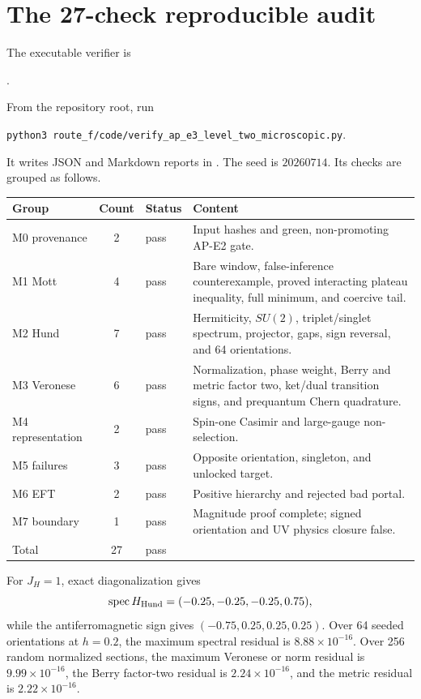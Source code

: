 \documentclass[11pt]{article}
\theoremstyle{definition}
\theoremstyle{remark}
\begin{document}
\section{The 27-check reproducible audit}

The executable verifier is
\begin{center}
.
\end{center}
From the repository root, run
\begin{center}
\texttt{python3 route\_f/code/verify\_ap\_e3\_level\_two\_microscopic.py}.
\end{center}
It writes JSON and Markdown reports in .  The seed is
\(20260714\).  Its checks are grouped as follows.

\begin{center}
\begin{tabularx}{\textwidth}{@{}lclX@{}}
\toprule
Group & Count & Status & Content\\
\midrule
M0 provenance & 2 & pass & Input hashes and green, non-promoting AP-E2 gate.\\
M1 Mott & 4 & pass & Bare window, false-inference counterexample, proved
interacting plateau inequality, full minimum, and coercive tail.\\
M2 Hund & 7 & pass & Hermiticity, \(SU(2)\), triplet/singlet spectrum,
projector, gaps, sign reversal, and 64 orientations.\\
M3 Veronese & 6 & pass & Normalization, phase weight, Berry and metric factor
two, ket/dual transition signs, and prequantum Chern quadrature.\\
M4 representation & 2 & pass & Spin-one Casimir and large-gauge
non-selection.\\
M5 failures & 3 & pass & Opposite orientation, singleton, and unlocked target.\\
M6 EFT & 2 & pass & Positive hierarchy and rejected bad portal.\\
M7 boundary & 1 & pass & Magnitude proof complete; signed orientation and UV
physics closure false.\\
\midrule
Total & 27 & pass & \\
\bottomrule
\end{tabularx}
\end{center}

For \(J_H=1\), exact diagonalization gives
\begin{equation}
 \operatorname{spec}H_{\rm Hund}=(-0.25,-0.25,-0.25,0.75),
\end{equation}
while the antiferromagnetic sign gives
\((-0.75,0.25,0.25,0.25)\).  Over 64 seeded orientations at \(h=0.2\), the
maximum spectral residual is \(8.88\times10^{-16}\).  Over 256 random
normalized sections, the maximum Veronese or norm residual is
\(9.99\times10^{-16}\), the Berry factor-two residual is
\(2.24\times10^{-16}\), and the metric residual is
\(2.22\times10^{-16}\).
\end{document}
